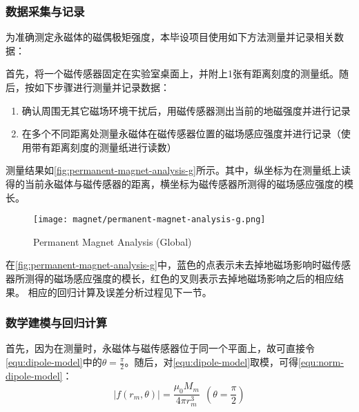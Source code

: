\subsubsection{数据采集与记录}
为准确测定永磁体的磁偶极矩强度，本毕设项目使用如下方法测量并记录相关数据：

首先，将一个磁传感器固定在实验室桌面上，并附上1张有距离刻度的测量纸。随后，按如下步骤进行测量并记录数据：
\begin{enumerate}
    \item 确认周围无其它磁场环境干扰后，用磁传感器测出当前的地磁强度并进行记录
    \item 在多个不同距离处测量永磁体在磁传感器位置的磁场感应强度并进行记录（使用带有距离刻度的测量纸进行读数）
\end{enumerate}

测量结果如\autoref{fig:permanent-magnet-analysis-g}所示。其中，纵坐标为在测量纸上读得的当前永磁体与磁传感器的距离，横坐标为磁传感器所测得的磁场感应强度的模长。

\begin{figure}[H]
    \centering
    \texttt{[image: magnet/permanent-magnet-analysis-g.png]}
    \caption{\label{fig:permanent-magnet-analysis-g}Permanent Magnet Analysis (Global)}
\end{figure} 

在\autoref{fig:permanent-magnet-analysis-g}中，蓝色的点表示未去掉地磁场影响时磁传感器所测得的磁场感应强度的模长，红色的叉则表示去掉地磁场影响之后的相应结果。
相应的回归计算及误差分析过程见下一节。

\subsubsection{数学建模与回归计算}
首先，因为在测量时，永磁体与磁传感器位于同一个平面上，故可直接令\autoref{equ:dipole-model}中的$\theta = \frac{\pi}{2}$。随后，对\autoref{equ:dipole-model}取模，可得\autoref{equ:norm-dipole-model}：
\begin{equation}
    \label{equ:norm-dipole-model}
    |f(r_m, \theta)| = \frac{\mu_0 M_m}{4\pi r_m^3}\ \ (\theta = \frac{\pi}{2})
\end{equation}

